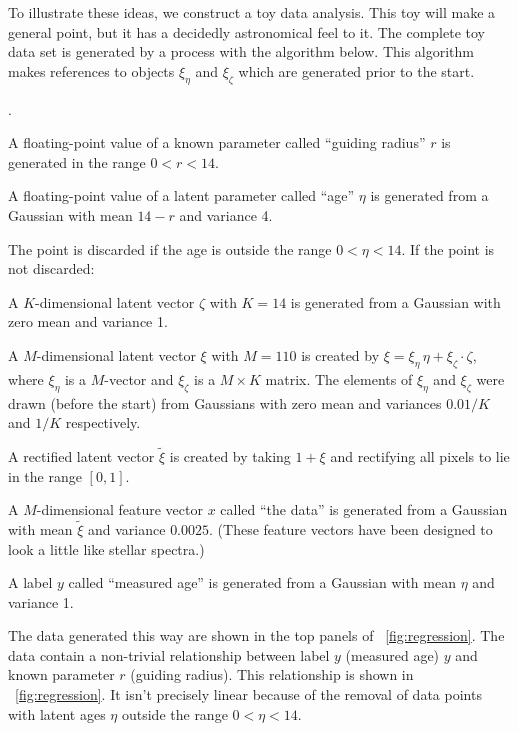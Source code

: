 \documentclass{article}
\newcommand{\figref}[1]{\figurename~\ref{#1}}
\newenvironment{hoggnumerate}
  {\begin{list}
    {\arabic{enumii}.}
    {\usecounter{enumii}
     \setlength{\itemsep}{0in}
     \setlength{\parsep}{0in}
     \setlength{\parskip}{0in}
    }
  }
{\end{list}}
\begin{document}
To illustrate these ideas, we construct a toy data analysis.
This toy will make a general point, but it has a decidedly astronomical feel to it.
The complete toy data set is generated by a process with the algorithm below.
This algorithm makes references to objects $\xi_\eta$ and $\xi_\zeta$ which are generated prior to the start.
\begin{hoggnumerate}
    \item A floating-point value of a known parameter called ``guiding radius'' $r$ is generated in the range $0<r<14$.
    \item A floating-point value of a latent parameter called ``age'' $\eta$ is generated from a Gaussian with mean $14 - r$ and variance 4.
    \item The point is discarded if the age is outside the range $0<\eta<14$. If the point is not discarded:
    \item A $K$-dimensional latent vector $\zeta$ with $K=14$ is generated from a Gaussian with zero mean and variance 1.
    \item A $M$-dimensional latent vector $\xi$ with $M=110$ is created by $\xi = \xi_\eta\,\eta + \xi_\zeta\cdot\zeta$, where $\xi_\eta$ is a $M$-vector and $\xi_\zeta$ is a $M\times K$ matrix.
    The elements of $\xi_\eta$ and $\xi_\zeta$ were drawn (before the start) from Gaussians with zero mean and variances $0.01/K$ and $1/K$ respectively.
    \item A rectified latent vector $\tilde{\xi}$ is created by taking $1 + \xi$ and rectifying all pixels to lie in the range $[0, 1]$.
    \item A $M$-dimensional feature vector $x$ called ``the data'' is generated from a Gaussian with mean $\tilde{\xi}$ and variance $0.0025$. (These feature vectors have been designed to look a little like stellar spectra.)
    \item A label $y$ called ``measured age'' is generated from a Gaussian with mean $\eta$ and variance 1.
\end{hoggnumerate}
The data generated this way are shown in the top panels of \figref{fig:regression}.
The data contain a non-trivial relationship between label $y$ (measured age) $y$ and known parameter $r$ (guiding radius).
This relationship is shown in \figref{fig:regression}.
It isn't precisely linear because of the removal of data points with latent ages $\eta$ outside the range $0<\eta<14$.
\end{document}
